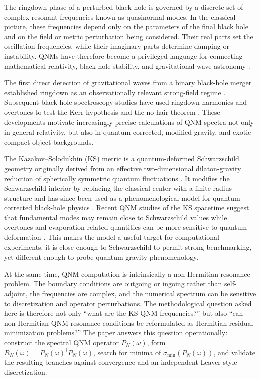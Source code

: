 \documentclass[10pt,letterpaper,twocolumn]{article}
\begin{document}
The ringdown phase of a perturbed black hole is governed by a discrete set of complex resonant frequencies known as quasinormal modes. In the classical picture, these frequencies depend only on the parameters of the final black hole and on the field or metric perturbation being considered. Their real parts set the oscillation frequencies, while their imaginary parts determine damping or instability. QNMs have therefore become a privileged language for connecting mathematical relativity, black-hole stability, and gravitational-wave astronomy \cite{Kokkotas1999,Berti2009,Konoplya2011}.

The first direct detection of gravitational waves from a binary black-hole merger established ringdown as an observationally relevant strong-field regime \cite{Abbott2016Observation}. Subsequent black-hole spectroscopy studies have used ringdown harmonics and overtones to test the Kerr hypothesis and the no-hair theorem \cite{Berti2006,Isi2019}. These developments motivate increasingly precise calculations of QNM spectra not only in general relativity, but also in quantum-corrected, modified-gravity, and exotic compact-object backgrounds.

The Kazakov--Solodukhin (KS) metric is a quantum-deformed Schwarzschild geometry originally derived from an effective two-dimensional dilaton-gravity reduction of spherically symmetric quantum fluctuations \cite{Kazakov1994}. It modifies the Schwarzschild interior by replacing the classical center with a finite-radius structure and has since been used as a phenomenological model for quantum-corrected black-hole physics \cite{Berry2021,Konoplya2020,Bolokhov2025}. Recent QNM studies of the KS spacetime suggest that fundamental modes may remain close to Schwarzschild values while overtones and evaporation-related quantities can be more sensitive to quantum deformation \cite{Konoplya2020,Bolokhov2025}. This makes the model a useful target for computational experiments: it is close enough to Schwarzschild to permit strong benchmarking, yet different enough to probe quantum-gravity phenomenology.

At the same time, QNM computation is intrinsically a non-Hermitian resonance problem. The boundary conditions are outgoing or ingoing rather than self-adjoint, the frequencies are complex, and the numerical spectrum can be sensitive to discretization and operator perturbations. The methodological question asked here is therefore not only ``what are the KS QNM frequencies?'' but also ``can non-Hermitian QNM resonance conditions be reformulated as Hermitian residual minimization problems?'' The paper answers this question operationally: construct the spectral QNM operator \(P_N(\omega)\), form \(R_N(\omega)=P_N(\omega)^\dagger P_N(\omega)\), search for minima of \(\sigma_{\min}(P_N(\omega))\), and validate the resulting branches against convergence and an independent Leaver-style discretization.
\end{document}
